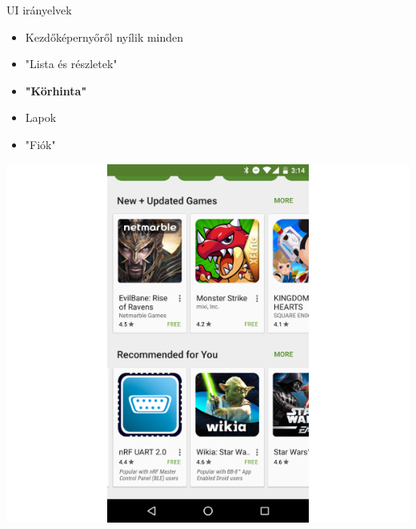 \documentclass{beamer}
\begin{document}
\begin{frame}[fragile]{UI irányelvek}
	\begin{minipage}{0.34\textwidth}
		\begin{itemize}
			\item Kezdőképernyőről nyílik minden 
			\item "Lista és részletek"
			\item \textbf{"Körhinta"}
			\item Lapok
			\item "Fiók"
		\end{itemize}
	\end{minipage}
	\begin{minipage}{0.65\textwidth}
		\begin{itemize}
			\includegraphics[width=1\linewidth]{figures/googlestorecarousel.png}
		\end{itemize}
	\end{minipage}
\end{frame}
\end{document}

